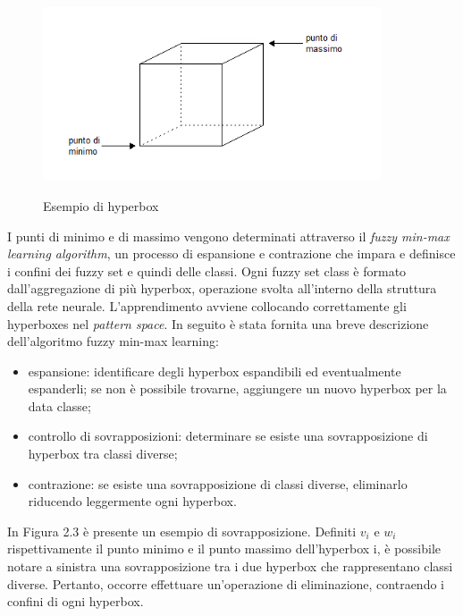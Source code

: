 \documentclass[11pt,  oneside, openany]{book}
\begin{document}
\begin{figure}[h!]
\begin{center}
  \includegraphics[width=10cm]{Immagini/hyperbox.png}\\
  \caption{Esempio di hyperbox}
\end{center}
\end{figure}

I punti di minimo e di massimo vengono determinati attraverso il \textit{fuzzy min-max learning algorithm}, un processo di espansione e contrazione che impara e definisce i confini dei fuzzy set e quindi delle classi. Ogni fuzzy set class è formato dall'aggregazione di più hyperbox, operazione svolta all'interno della struttura della rete neurale. L'apprendimento avviene collocando correttamente gli hyperboxes nel \textit{pattern space}. In seguito è stata fornita una breve descrizione dell'algoritmo fuzzy min-max learning: 

\begin{itemize}
\item espansione: identificare degli hyperbox espandibili ed eventualmente espanderli; se non è possibile trovarne, aggiungere un nuovo hyperbox per la data classe;
\item controllo di sovrapposizioni: determinare se esiste una sovrapposizione di hyperbox tra classi diverse;
\item contrazione: se esiste una sovrapposizione di classi diverse, eliminarlo riducendo leggermente ogni hyperbox.
\end{itemize}

In Figura 2.3 è presente un esempio di sovrapposizione. Definiti $v_i$ e $w_i$ rispettivamente il punto minimo e il punto massimo dell'hyperbox i, è possibile notare a sinistra una sovrapposizione tra i due hyperbox che rappresentano classi diverse. Pertanto, occorre effettuare un'operazione di eliminazione, contraendo i confini di ogni hyperbox. 
\end{document}
